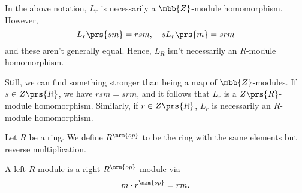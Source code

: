 \documentclass[11pt]{kbook}
\newcommand{\op}{{\mrm{op}}}
\begin{document}
\begin{remark}
In the above notation, $L_r$ is necessarily a $\mbb{Z}$-module homomorphism. However,
\[L_r\prs{sm} = rsm, \quad s L_r\prs{m} = srm\]
and these aren't generally equal. Hence, $L_R$ isn't necessarily an $R$-module homomorphism.

Still, we can find something stronger than being a map of $\mbb{Z}$-modules.
If $s \in Z\prs{R}$, we have $rsm = srm$, and it follows that $L_r$ is a ${Z}\prs{R}$-module homomorphism. Similarly, if $r \in Z\prs{R}$, $L_r$ is necessarily an $R$-module homomorphism.
\end{remark}

\begin{definition}
Let $R$ be a ring. We define $R^\op$ to be the ring with the same elements but reverse multiplication.
\end{definition}

\begin{remark}
A left $R$-module is a right $R^\op$-module via
\[m \cdot r^\op = r m \text{.}\]
\end{remark}


\printbibliography
\end{document}
